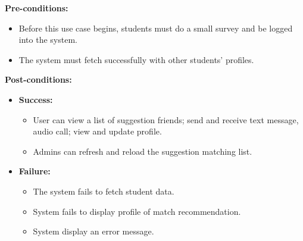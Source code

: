 \documentclass[12pt]{article}
\begin{document}
    \noindent \textbf{Pre-conditions:} 
        \begin{itemize}
            \item Before this use case begins, students must do a small survey and be logged into the system.
            \item The system must fetch successfully with other students’ profiles.
        \end{itemize}
    \noindent \textbf{Post-conditions:}
    \begin{itemize}
        \item \textbf{Success:}
        \begin{itemize}
            \item User can view a list of suggestion friends; send and receive text message, audio call; view and update profile.
            \item Admins can refresh and reload the suggestion matching list.
        \end{itemize}
        \item \textbf{Failure:}
        \begin{itemize}
            \item The system fails to fetch student data.
            \item System fails to display profile of match recommendation.
            \item System display an error message. 
        \end{itemize}
    \end{itemize}
\end{document}
